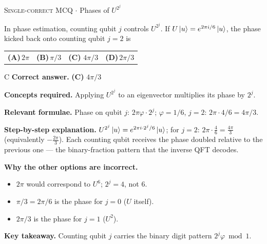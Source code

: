 \documentclass[11pt,a4paper]{article}
\newcommand{\optlabel}[1]{\textbf{(#1)}}
\newcommand{\correctlabel}[1]{\textcolor{okgreen}{\textbf{(#1)}\,\ding{51}}}
\newenvironment{qitem}[1]{\begin{list}{}{\setlength{\leftmargin}{3.3em}\setlength{\labelwidth}{3.1em}%
  \setlength{\labelsep}{0.2em}\setlength{\topsep}{3pt}\setlength{\parsep}{3pt}}\item[\textbf{Q.#1}\hfill]}{\end{list}}
\newcommand{\qsep}{\par\vspace{2pt}{\color{black!15}\hrule}\vspace{4pt}}
\newcommand{\qmeta}[2]{{\footnotesize\color{black!60}\textsc{#1} \;$\cdot$\; #2}\par}
\begin{document}
\begin{qitem}{27}
\qmeta{Single-correct MCQ}{Phases of $U^{2^j}$}
In phase estimation, counting qubit $j$ controls $U^{2^j}$. If $U\ket u = e^{2\pi i/6}\ket u$, the phase kicked back onto counting qubit $j = 2$ is
\par\smallskip\noindent\begin{tabularx}{\linewidth}{@{}*{4}{L}@{}}
\optlabel{A}\,$2\pi$ & \optlabel{B}\,$\pi/3$ & \correctlabel{C}\,$4\pi/3$ & \optlabel{D}\,$2\pi/3$
\end{tabularx}
\end{qitem}
\begin{solbox}{C}
\textbf{\color{brand}Correct answer.} \textcolor{okgreen}{\textbf{(C)}} $4\pi/3$

\textbf{\color{brand}Concepts required.} Applying $U^{2^j}$ to an eigenvector multiplies its phase by $2^j$.

\textbf{\color{brand}Relevant formulae.} Phase on qubit $j$: $2\pi\varphi\cdot2^j$; $\varphi = 1/6$, $j = 2$: $2\pi\cdot4/6 = 4\pi/3$.

\textbf{\color{brand}Step-by-step explanation.} $U^{2^j}\ket u = e^{2\pi i\cdot2^j/6}\ket u$; for $j = 2$: $2\pi\cdot\frac46 = \frac{4\pi}{3}$ (equivalently $-\frac{2\pi}{3}$). Each counting qubit receives the phase
doubled relative to the previous one --- the binary-fraction pattern that the inverse QFT decodes.

\textbf{\color{brand}Why the other options are incorrect.}
\begin{itemize}[leftmargin=2.4em, itemsep=1pt, topsep=2pt]
\item[\textbf{(A)}] $2\pi$ would correspond to $U^6$; $2^j = 4$, not $6$.
\item[\textbf{(B)}] $\pi/3 = 2\pi/6$ is the phase for $j = 0$ ($U$ itself).
\item[\textbf{(D)}] $2\pi/3$ is the phase for $j = 1$ ($U^2$).
\end{itemize}
\textbf{\color{brand}Key takeaway.} Counting qubit $j$ carries the binary digit pattern $2^j\varphi \bmod 1$.
\end{solbox}
\qsep
\end{document}

